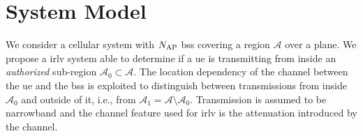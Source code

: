 \documentclass[conference]{IEEEtran}
\begin{document}

 
\section{System Model}\label{sec:sys model}


We consider a cellular system with $N_{\rm AP}$ \acp{bs} covering a region $\mathcal{A}$ over a plane. We propose a \ac{irlv} system able to determine if a \ac{ue} is transmitting from inside an {\em authorized} sub-region $\mathcal{A}_0 \subset \mathcal{A}$. The location dependency of the channel between the \ac{ue} and the \acp{bs} is exploited to distinguish between transmissions from inside $\mathcal{A}_0$ and outside of it, i.e., from  $\mathcal{A}_1=\mathcal{A} \setminus \mathcal{A}_0$.  Transmission is assumed to be narrowband and the channel feature used for \ac{irlv} is the attenuation introduced by the channel.
\end{document}
